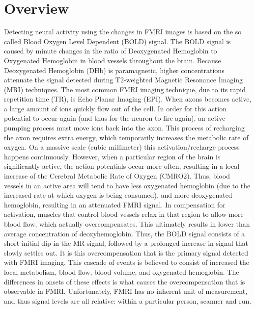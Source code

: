 \section{Overview}
\label{sec:Introduction Overview}
Detecting neural activity using the changes in FMRI images is based on 
the so called Blood Oxygen Level Dependent (BOLD) signal.
The BOLD signal is caused by minute changes in the ratio of Deoxygenated
Hemoglobin to Oxygenated Hemoglobin in blood vessels throughout the brain.
Because Deoxygenated Hemoglobin (DHb) is paramagnetic, higher concentrations
attenuate the signal detected during T2-weighted Magnetic Resonance Imaging (MRI)
techniques. The most common FMRI imaging technique, due to its rapid repetition 
time (TR), is Echo Planar Imaging (EPI). When axons becomes active,
a large amount of ions quickly flow out of the cell. In order for this
action potential to occur again (and thus for the neuron to fire again),
an active pumping process must move ions back into the
axon. This process of recharging the axon requires extra energy, which temporarily
increases the metabolic rate of oxygen. On a massive scale (cubic millimeter) 
this activation/recharge process happens continuously. However, when a 
particular region of the brain is significantly active, the action potentials
occur more often, resulting in a local increase of the 
Cerebral Metabolic Rate of Oxygen (CMRO2). Thus, blood vessels in an
active area will 
tend to have less oxygenated hemoglobin (due to the increased rate at which
oxygen is being consumed), and more deoxygenated hemoglobin,
resulting in an attenuated FMRI signal. In compensation for 
activation, muscles that
control blood vessels relax in that region to allow more blood flow,
which actually overcompensates.
This ultimately results in lower than average concentration of 
deoxyhemoglobin. Thus, the BOLD signal consists of a short initial
dip in the MR signal, followed by a prolonged increase in signal
that slowly settles out. It is this overcompensation that is the 
primary signal detected with FMRI imaging. This cascade of events
is believed to consist of increased the local metabolism, 
blood flow, blood volume, and oxygenated hemoglobin. The differences
in onsets of these effects is what causes the overcompensation
that is observable in FMRI. Unfortunately, FMRI has no inherent unit
of measurement, and thus signal levels are all relative: within a particular
person, scanner and run. 

